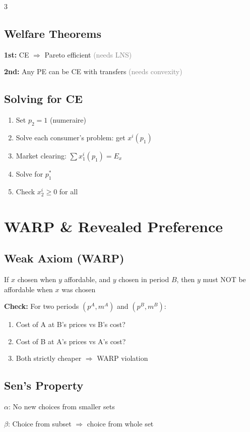 \documentclass[10pt,landscape]{article}
\newcommand{\note}[1]{\textcolor{gray}{\small(#1)}}
\begin{document}
\begin{multicols}{3}
\subsection{Welfare Theorems}

\textbf{1st:} CE $\Rightarrow$ Pareto efficient \note{needs LNS}

\textbf{2nd:} Any PE can be CE with transfers \note{needs convexity}

\subsection{Solving for CE}
\begin{enumerate}[leftmargin=*,noitemsep]
\item Set $p_2 = 1$ (numeraire)
\item Solve each consumer's problem: get $x^i(p_1)$
\item Market clearing: $\sum x_1^i(p_1) = E_x$
\item Solve for $p_1^*$
\item Check $x_2^i \geq 0$ for all
\end{enumerate}

\section{WARP \& Revealed Preference}

\subsection{Weak Axiom (WARP)}
If $x$ chosen when $y$ affordable, and $y$ chosen in period $B$, then $y$ must NOT be affordable when $x$ was chosen

\textbf{Check:} For two periods $(p^A, m^A)$ and $(p^B, m^B)$:
\begin{enumerate}[leftmargin=*,noitemsep]
\item Cost of A at B's prices vs B's cost?
\item Cost of B at A's prices vs A's cost?
\item Both strictly cheaper $\Rightarrow$ WARP violation
\end{enumerate}

\subsection{Sen's Property}
$\alpha$: No new choices from smaller sets

$\beta$: Choice from subset $\Rightarrow$ choice from whole set


\end{multicols}
\end{document}
